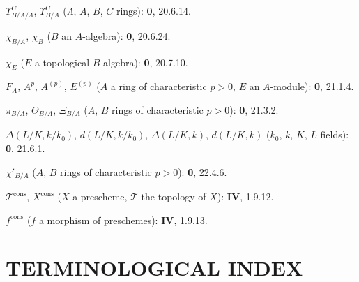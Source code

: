 \clearpage
{}
$\Upsilon^C_{B/A/\Lambda}$, $\Upsilon^C_{B/A}$ ($\Lambda$, $A$, $B$, $C$ rings): \textbf{0}, 20.6.14.\par
$\chi_{B/A}$, $\chi_B$ ($B$ an $A$-algebra): \textbf{0}, 20.6.24.\par
$\chi_E$ ($E$ a topological $B$-algebra): \textbf{0}, 20.7.10.\par
$F_A$, $A^p$, $A^{(p)}$, $E^{(p)}$ ($A$ a ring of characteristic $p>0$, $E$ an $A$-module): \textbf{0}, 21.1.4.\par
$\pi_{B/A}$, $\Theta_{B/A}$, $\Xi_{B/A}$ ($A$, $B$ rings of characteristic $p>0$): \textbf{0}, 21.3.2.\par
$\Delta(L/K,k/k_0)$, $d(L/K,k/k_0)$, $\Delta(L/K,k)$, $d(L/K,k)$ ($k_0$, $k$, $K$, $L$ fields): \textbf{0}, 21.6.1.\par
$\chi'_{B/A}$ ($A$, $B$ rings of characteristic $p>0$): \textbf{0}, 22.4.6.\par
$\mathscr T^{\mathrm{cons}}$, $X^{\mathrm{cons}}$ ($X$ a prescheme, $\mathscr T$ the topology of $X$): \textbf{IV}, 1.9.12.\par
$f^{\mathrm{cons}}$ ($f$ a morphism of preschemes): \textbf{IV}, 1.9.13.\par

\clearpage
{}
{}

\section*{TERMINOLOGICAL INDEX}


